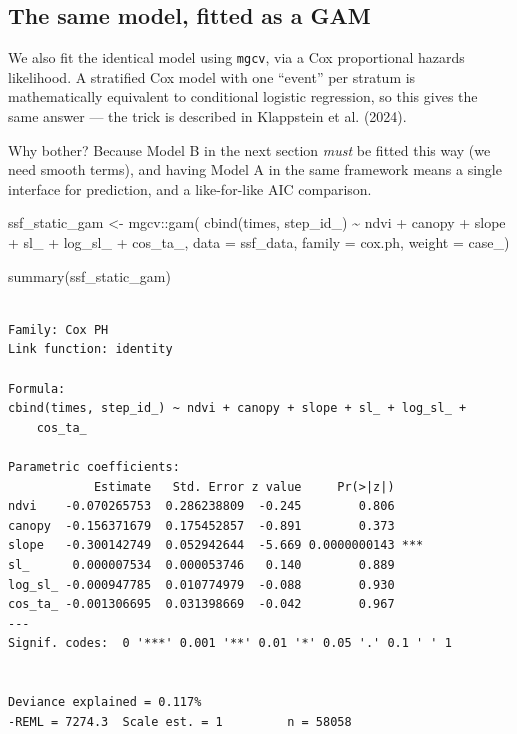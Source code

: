 \documentclass[
  letterpaper,
  DIV=11,
  numbers=noendperiod]{scrartcl}
\newenvironment{Shaded}{\begin{snugshade}}{\end{snugshade}}
\newcommand{\AttributeTok}[1]{\textcolor[rgb]{0.40,0.45,0.13}{#1}}
\newcommand{\FunctionTok}[1]{\textcolor[rgb]{0.28,0.35,0.67}{#1}}
\newcommand{\NormalTok}[1]{\textcolor[rgb]{0.00,0.23,0.31}{#1}}
\newcommand{\OtherTok}[1]{\textcolor[rgb]{0.00,0.23,0.31}{#1}}
\newcommand{\SpecialCharTok}[1]{\textcolor[rgb]{0.37,0.37,0.37}{#1}}
\begin{document}
\subsection{The same model, fitted as a
GAM}\label{the-same-model-fitted-as-a-gam}

We also fit the identical model using \texttt{mgcv}, via a Cox
proportional hazards likelihood. A stratified Cox model with one
``event'' per stratum is mathematically equivalent to conditional
logistic regression, so this gives the same answer --- the trick is
described in Klappstein et al. (2024).

Why bother? Because Model B in the next section \emph{must} be fitted
this way (we need smooth terms), and having Model A in the same
framework means a single interface for prediction, and a like-for-like
AIC comparison.

\begin{Shaded}
\begin{Highlighting}[]
\NormalTok{ssf\_static\_gam }\OtherTok{\textless{}{-}}\NormalTok{ mgcv}\SpecialCharTok{::}\FunctionTok{gam}\NormalTok{(}
  \FunctionTok{cbind}\NormalTok{(times, step\_id\_) }\SpecialCharTok{\textasciitilde{}}\NormalTok{ ndvi }\SpecialCharTok{+}\NormalTok{ canopy }\SpecialCharTok{+}\NormalTok{ slope }\SpecialCharTok{+}\NormalTok{ sl\_ }\SpecialCharTok{+}\NormalTok{ log\_sl\_ }\SpecialCharTok{+}\NormalTok{ cos\_ta\_,}
  \AttributeTok{data =}\NormalTok{ ssf\_data, }\AttributeTok{family =}\NormalTok{ cox.ph, }\AttributeTok{weight =}\NormalTok{ case\_)}

\FunctionTok{summary}\NormalTok{(ssf\_static\_gam)}
\end{Highlighting}
\end{Shaded}

\begin{verbatim}

Family: Cox PH 
Link function: identity 

Formula:
cbind(times, step_id_) ~ ndvi + canopy + slope + sl_ + log_sl_ + 
    cos_ta_

Parametric coefficients:
            Estimate   Std. Error z value     Pr(>|z|)    
ndvi    -0.070265753  0.286238809  -0.245        0.806    
canopy  -0.156371679  0.175452857  -0.891        0.373    
slope   -0.300142749  0.052942644  -5.669 0.0000000143 ***
sl_      0.000007534  0.000053746   0.140        0.889    
log_sl_ -0.000947785  0.010774979  -0.088        0.930    
cos_ta_ -0.001306695  0.031398669  -0.042        0.967    
---
Signif. codes:  0 '***' 0.001 '**' 0.01 '*' 0.05 '.' 0.1 ' ' 1


Deviance explained = 0.117%
-REML = 7274.3  Scale est. = 1         n = 58058
\end{verbatim}
\end{document}
